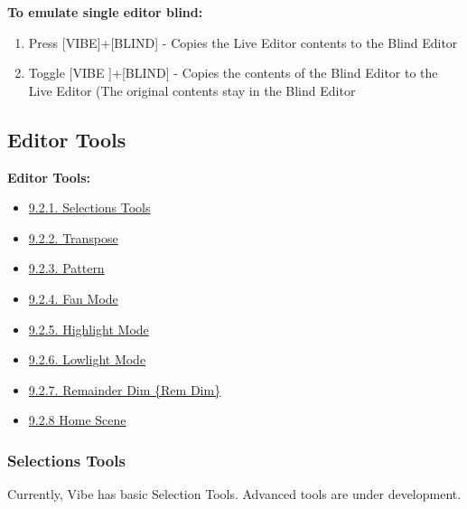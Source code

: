\documentclass[
]{article}
\providecommand{\tightlist}{%
  \setlength{\itemsep}{0pt}\setlength{\parskip}{0pt}}
\begin{document}
\textbf{To emulate single editor blind:}

\begin{enumerate}
\def\labelenumi{\arabic{enumi}.}
\item
  Press {[}VIBE{]}+{[}BLIND{]} - Copies the Live Editor contents to the Blind Editor
\item
  Toggle {[}VIBE {]}+{[}BLIND{]} - Copies the contents of the Blind Editor to the Live Editor (The original contents stay in the Blind Editor
\end{enumerate}

\hypertarget{editor-tools}{%
\subsection{Editor Tools}\label{editor-tools}}

\textbf{Editor Tools:}

\begin{itemize}
\tightlist
\item
  \href{https://vibemanual.compulite.com/programming-basics.html\#selections-tools}{9.2.1. Selections Tools}
\item
  \href{https://vibemanual.compulite.com/programming-basics.html\#pattern}{9.2.2. Transpose}
\item
  \href{https://vibemanual.compulite.com/programming-basics.html\#fan-mode}{9.2.3. Pattern}
\item
  \href{https://vibemanual.compulite.com/programming-basics.html\#fan-mode}{9.2.4. Fan Mode}
\item
  \href{https://vibemanual.compulite.com/programming-basics.html\#highlight-mode}{9.2.5. Highlight Mode}
\item
  \href{https://vibemanual.compulite.com/programming-basics.html\#lowlight-mode}{9.2.6. Lowlight Mode}
\item
  \href{https://vibemanual.compulite.com/programming-basics.html\#remainder-dim-rem-dim}{9.2.7. Remainder Dim \{Rem Dim\}}
\item
  \href{https://vibemanual.compulite.com/programming-basics.html\#home-scene}{9.2.8 Home Scene}
\end{itemize}

\hypertarget{selections-tools}{%
\subsubsection{Selections Tools}\label{selections-tools}}

Currently, Vibe has basic Selection Tools. Advanced tools are under development.
\end{document}
